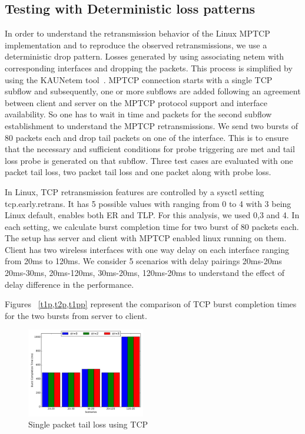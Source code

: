 \documentclass[10pt,draftcls,twocolumn]{IEEEconf}
\begin{document}
\subsection{Testing with Deterministic loss patterns}
In order to understand the retransmission behavior of the Linux MPTCP implementation and to reproduce the observed retransmissions, we use a deterministic drop pattern.
Losses generated by using associating netem with corresponding interfaces and dropping the packets. This process is simplified by using the KAUNetem tool~\cite{Garcia2016}. 
MPTCP connection starts with a single TCP subflow and subsequently, one or more subflows are added following an agreement between client and server on the MPTCP protocol 
support and interface availability. So one has to wait in time and packets for the second subflow establishment to understand the MPTCP retransmissions. We send two bursts of 80 
packets each and drop tail packets on one of the interface. This is to ensure that the necessary and sufficient conditions for probe triggering are met and tail loss probe is generated on that
subflow. Three test cases are evaluated with one packet tail loss, two packet tail loss and  one packet along with probe loss. 

In Linux, TCP retransmission features are controlled by a sysctl setting tcp.early.retrans. It has 5 possible values with ranging from 0 to 4 with 3 being Linux default, enables both
ER and TLP. For this analysis, we used 0,3 and 4. In each setting, we calculate burst completion time for two burst of 80 packets each. The setup has server and client with MPTCP
enabled linux running on them. Client has two wireless interfaces with one way delay on each interface ranging from 20ms to 120ms. We consider 5 scenarios with delay pairings 20ms-20ms
20ms-30ms, 20ms-120ms, 30ms-20ms, 120ms-20ms to understand the effect of delay difference in the performance. 


Figures ~\ref{t1p,t2p,t1pp} represent the comparison of TCP burst completion times for the two bursts from server to client.

\begin{figure}[!ht]
\begin{center}
\includegraphics[angle=0, width=0.46\textwidth,natwidth=578.16,natheight=433.62]{plots/T1P.pdf}
\caption{Single packet tail loss using TCP}\label{t1p}
\end{center}
\end{figure}
\end{document}
